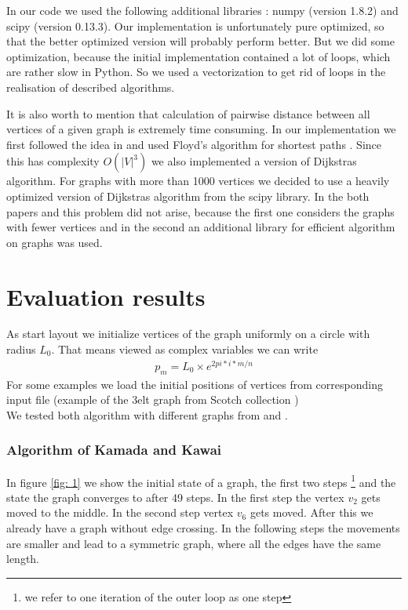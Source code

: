 \documentclass[12pt,a4paper]{article}
\begin{document}
In our code we used the following additional libraries : numpy (version 1.8.2) and scipy (version 0.13.3). Our implementation is unfortunately pure optimized, so that the better optimized version will probably perform better. But we did some optimization, because the initial implementation contained a lot of loops, which are rather slow in Python. So we used a vectorization to get rid of loops in the realisation of described algorithms.

It is also worth to mention that calculation of pairwise distance between all vertices of a given graph is extremely time consuming. In our implementation we first followed the idea in \cite{TomihisaKamada1989} and used Floyd's algorithm for shortest paths \cite{Floyd1962}. Since this has complexity $ O(|V|^3)$ we also implemented a version of Dijkstras algorithm. For graphs with more than 1000 vertices we decided to use a heavily optimized version of Dijkstras algorithm from the scipy library. In the both papers \cite{TomihisaKamada1989} and \cite{DavidHarel2002} this problem did not arise, because the first one considers the graphs with fewer vertices and in the second an additional library for efficient algorithm on graphs was used.

\section{Evaluation results}

As start layout we initialize vertices of the graph uniformly on a circle with radius $L_0$. That means viewed as complex variables we can write 
\begin{align*}
p_m =L_0 \times e^{2 pi*i*m /n}
\end{align*}
For some examples we load the initial positions of vertices from corresponding input file (example of the 3elt graph from Scotch collection \cite{JordiPetit})\\

We tested both algorithm with different graphs from \cite{TomihisaKamada1989} and \cite{DavidHarel2002}. 

\FloatBarrier 

\subsubsection*{Algorithm of Kamada and Kawai}

In figure \ref{fig: 1} we show the initial state of a graph, the first two steps \footnote{we refer to one iteration of the outer loop as one step}  and the state the graph converges to after 49 steps. In the first step the vertex $v_2$ gets moved to the middle. In the second step vertex $v_6$ gets moved. After this we already have a graph without edge crossing. In the following steps the movements are smaller and lead to a symmetric graph, where all the edges have the same length.
\end{document}
